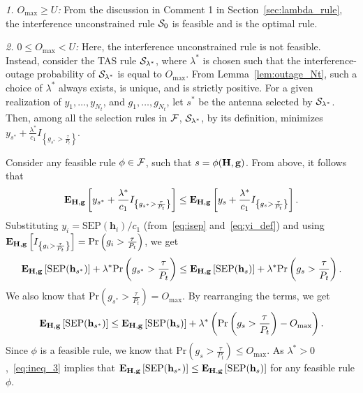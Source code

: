 \documentclass[12pt,draftcls,peerreview,onecolumn]{IEEEtran}
\newcommand{\brac}[1]{\left({#1}\right)}
\newcommand{\cbrac}[1]{\left\{{#1}\right\}}
\newcommand{\indic}[1]{I_{\cbrac{#1}}}
\newcommand{\mtx}[1]{{\bf #1}} %
\newcommand{\explow}[2]{{\bf{E}}_{#1}\left[{#2}\right]}
\newcommand{\prob}[1]{\text{Pr}\brac{#1}}
\newcommand{\SEP}{\text{SEP}}
\newcommand{\lam}{\lambda}
\newcommand{\lamstar}{\lam^{*}}
\newcommand{\sstar}{s^{*}}
\newcommand{\F}{\cal{F}}
\newcommand{\Nt}{{N_t}}
\newcommand{\Pt}{{P_t}}
\newcommand{\such}{h}
\newcommand{\puch}{g}
\newcommand{\gk}[1]{{\puch_{#1}}}
\newcommand{\g}{\mathbf{\puch}}
\newcommand{\outmax}{O_{\text{max}}}
\newcommand{\itau}{\tau}
\newcommand{\cone}{c_{1}}
\newcommand{\taubypt}{\frac{\itau}{\Pt}}
\newcommand{\gkgrtaubypt}[1]{{\gk{#1}}>\taubypt}
\newcommand{\gindic}[1]{\indic{\gkgrtaubypt{#1}}}
\newcommand{\yk}[1]{y_{#1}}
\newcommand{\un}{U}
\newcommand{\asrule}{\phi}
\newcommand{\Hmx}{\mtx{H}}
\newcommand{\caluncons}{{\cal S_{\text{0}}}}
\newcommand{\callamstarrule}{\cal S_{\lam^{*}}}
\begin{document}
{\em 1. $\outmax\geq\un$:} From the discussion in Comment 1 in Section~\ref{sec:lambda_rule}, the interference unconstrained rule $\caluncons$ is feasible and is the optimal rule. 

{\em 2. $0\leq\outmax<\un$:} Here, the interference unconstrained rule is not feasible.  Instead, consider the TAS rule $\callamstarrule$, where $\lamstar$ is chosen such that the interference-outage probability of $\callamstarrule$ is equal to $\outmax$. From Lemma~\ref{lem:outage_Nt}, such a choice of $\lamstar$ always exists, is unique, and is strictly positive. For a given realization of $\yk{1},\ldots,\yk{\Nt}$, and $\gk{1},\ldots,\gk{\Nt}$, let $\sstar$ be the antenna selected by $\callamstarrule$. Then, among all the selection rules in $\F$, $\callamstarrule$, by its definition,  minimizes $\yk{{\sstar}} + \frac{\lamstar}{\cone}\gindic{{\sstar}}$. 

Consider any feasible rule $\asrule\in\F$, such that  $s=\phi(\Hmx,\g)$. From above, it follows that   
\begin{equation}
\label{eq:opt_rul_1}  
   \explow{\Hmx,\g}{\yk{{\sstar}} + \frac{\lamstar}{\cone}\gindic{{\sstar}}} \leq  \explow{\Hmx,\g}{\yk{{s}} + \frac{\lamstar}{\cone}\gindic{{s}}}.
\end{equation}
Substituting $\yk{i}={\SEP(\mathbf{\such}_{i})}/{\cone}$ (from~\eqref{eq:isep} and~\eqref{eq:yi_def}) and using $\explow{\Hmx,\g}{\gindic{i}}=\prob{\gk{i}>\taubypt}$, we get
%
\begin{equation}
\label{eq:opt_rul_2}
   \explow{\Hmx,\g}{\SEP(\hsstar)} + \lamstar  \prob{\gk{\sstar}>\taubypt} \leq  \explow{\Hmx,\g}{\SEP(\hs)} + \lamstar  \prob{\gk{s}>\taubypt}.
\end{equation}
%
We also know that $\prob{\gk{\sstar}>\taubypt}=\outmax$. By rearranging the terms, we get
%
\begin{equation}
\label{eq:ineq_3}
\explow{\Hmx,\g}{\SEP(\hsstar)} \leq \explow{\Hmx,\g}{\SEP(\hs)} + \lamstar \left( \prob{\gk{s}>\taubypt} -  \outmax \right).
\end{equation}
%
Since $\phi$ is a feasible rule, we know that $\prob{\gkgrtaubypt{s}}\leq \outmax$. As $\lamstar>0$,~\eqref{eq:ineq_3} implies that $\explow{\Hmx,\g}{\SEP(\hsstar)} \leq \explow{\Hmx,\g}{\SEP(\hs)}$ for any feasible rule $\phi$. %
\end{document}
